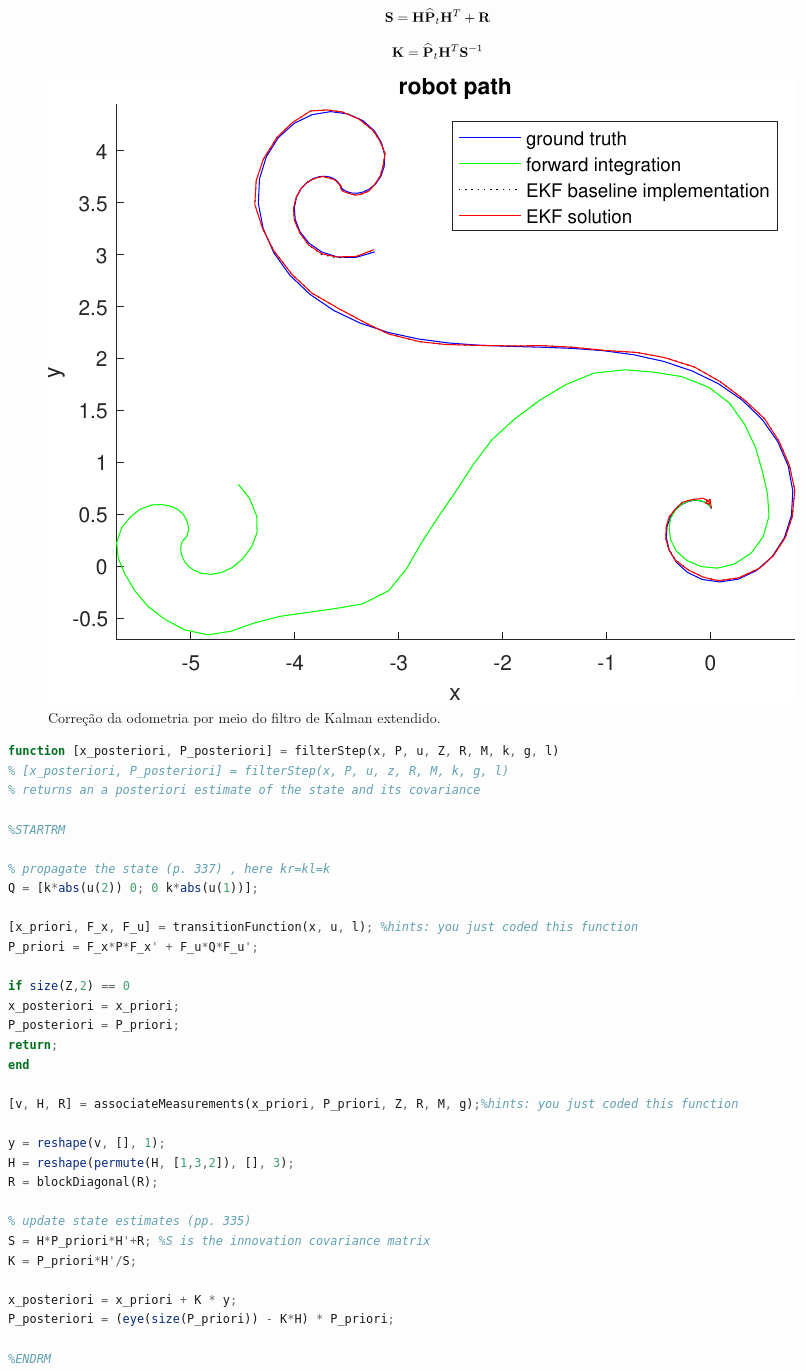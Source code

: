 \begin{equation}\label{eq:S}
	\mathbf{S} = \mathbf{H}\widehat{\mathbf{P}}_t\mathbf{H}^T + \mathbf{R}
\end{equation}

\begin{equation}\label{eq:K}
	\mathbf{K} = \widehat{\mathbf{P}}_t\mathbf{H}^T\mathbf{S}^{-1}
\end{equation}


\begin{figure}[H]
	\centering
	\includegraphics[width=0.75\linewidth]{img/odometry_filtered}
	\caption{Correção da odometria por meio do filtro de Kalman extendido.}
	\label{fig:odometry_filtered}
\end{figure}

\begin{lstlisting}[language=Octave]
function [x_posteriori, P_posteriori] = filterStep(x, P, u, Z, R, M, k, g, l)
% [x_posteriori, P_posteriori] = filterStep(x, P, u, z, R, M, k, g, l)
% returns an a posteriori estimate of the state and its covariance

%STARTRM

% propagate the state (p. 337) , here kr=kl=k
Q = [k*abs(u(2)) 0; 0 k*abs(u(1))]; 

[x_priori, F_x, F_u] = transitionFunction(x, u, l); %hints: you just coded this function
P_priori = F_x*P*F_x' + F_u*Q*F_u';

if size(Z,2) == 0
x_posteriori = x_priori;
P_posteriori = P_priori;
return;
end

[v, H, R] = associateMeasurements(x_priori, P_priori, Z, R, M, g);%hints: you just coded this function

y = reshape(v, [], 1);
H = reshape(permute(H, [1,3,2]), [], 3);
R = blockDiagonal(R);

% update state estimates (pp. 335)
S = H*P_priori*H'+R; %S is the innovation covariance matrix
K = P_priori*H'/S;

x_posteriori = x_priori + K * y;
P_posteriori = (eye(size(P_priori)) - K*H) * P_priori;

%ENDRM
\end{lstlisting}


